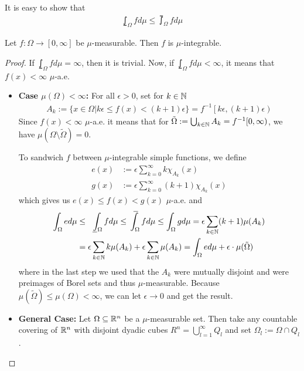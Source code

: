 It is easy to show that
\begin{align*}
 \lowint_{\Omega} f d \mu \leq \upint_{\Omega} f d \mu
\end{align*}

\begin{prop}[]
  Let $f: \Omega \to [0,\infty]$ be $\mu$-measurable. Then $f$ is $\mu$-integrable.
\end{prop}
\begin{proof}
  If $\lowint_{\Omega} f d \mu = \infty$, then it is trivial.
  Now, if $\lowint_{\Omega}f d \mu < \infty$, it means that $f(x) < \infty$ $\mu$-a.e.

  \begin{itemize}
    \item \textbf{Case $\mu(\Omega) < \infty$:}
      For all $\epsilon > 0$, set for $k \in \mathbb{N}$
      \begin{align*}
        A_k := \{x \in \Omega \big\vert k \epsilon \leq f(x) < (k+1)\epsilon\} = f^{-1}\left[k \epsilon, (k+1)\epsilon\right)
      \end{align*}
      Since $f(x) < \infty$ $\mu$-a.e. it means that for $\tilde{\Omega} := \bigcup_{k \in \mathbb{N}} A_k = f^{-1}[0,\infty)$, we have $\mu(\Omega \setminus \tilde{\Omega}) = 0$.

      To sandwich $f$ between $\mu$-integrable simple functions, we define
      \begin{align*}
        e(x) &:= \epsilon \sum_{k=0}^{\infty} k \chi_{A_k}(x)\\
        g(x) &:= \epsilon \sum_{k=0}^{\infty} (k+1) \chi_{A_k}(x)
      \end{align*}
      which gives us $e(x) \leq f(x) < g(x)$ $\mu$-a.e. and
      \begin{align*}
        \int_{\Omega}e d \mu 
        &\leq 
        \lowint_{\Omega} f d \mu 
        \leq \upint_{\Omega} f d \mu 
        \leq \int_{\Omega} g d \mu
        = \epsilon\sum_{k \in \N}(k+1) \mu(A_k)\\
        &= \epsilon \sum_{k\in \N} k \mu(A_k) + \epsilon \sum_{k \in \N} \mu(A_k)
        = \int_{\Omega} e d \mu + \epsilon \cdot \mu(\tilde{\Omega})
      \end{align*}
      where in the last step we used that the $A_k$ were mutually disjoint and were preimages of Borel sets and thus $\mu$-measurable.
      Because $\mu(\tilde{\Omega}) \leq \mu(\Omega) < \infty$, we can let $\epsilon \to 0$ and get the result.

    \item \textbf{General Case:} Let $\Omega \subseteq \mathbb{R}^{n}$ be a $\mu$-measurable set. 
      Then take any countable covering of $\mathbb{R}^{n}$ with disjoint dyadic cubes $R^{n} = \bigcup_{l=1}^{\infty}Q_l$ and set $\Omega_l := \Omega \cap Q_l$.


\end{itemize}
\end{proof}

